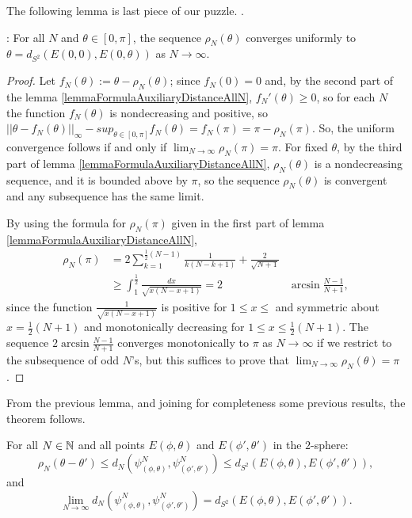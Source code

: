 The following lemma is last piece of our puzzle. \cite{DAndrea2013}.
\begin{lemma}: For all $N$ and $\theta \in [0, \pi]$, the sequence $\rho_N(\theta)$ converges uniformly to $\theta = d_{S^2}(E(0, 0), E(0, \theta))$ as $N\to \infty$. 
\end{lemma}

\begin{proof}
 Let $f_N(\theta) := \theta - \rho_N(\theta)$; since $f_N(0) = 0$ and, by the second part of the lemma \ref{lemmaFormulaAuxiliaryDistanceAllN}, $f_N'(\theta) \geq 0$, so for each $N$ the function $f_N(\theta)$ is nondecreasing and positive, so $|| \theta - f_N(\theta)||_\infty - sup_{\theta \in [0, \pi]} f_N(\theta) = f_N(\pi) = \pi - \rho_N(\pi)$. So, the uniform convergence follows if and only if $\lim_{N \to \infty} \rho_N(\pi) = \pi$. For fixed $\theta$, by the third part of lemma \ref{lemmaFormulaAuxiliaryDistanceAllN}, $\rho_N(\theta)$ is a nondecreasing sequence, and it is bounded above by $\pi$, so the sequence $\rho_N(\theta)$ is convergent and any subsequence has the same limit.
 
 By using the formula for $\rho_N(\pi)$ given in the first part of lemma \ref{lemmaFormulaAuxiliaryDistanceAllN}, 
 \begin{align*}
     \rho_N(\pi) &= 2 \sum_{k = 1}^{\frac{1}{2}(N-1)} \frac{1}{k (N - k + 1)} + \frac{2}{\sqrt{N+1}} \\
     &\geq \int_{1}^{\frac{1}{2}} \frac{dx}{\sqrt{x(N-x+1)}} = 2 &\arcsin \frac{N-1}{N+1},
 \end{align*} since the function $\frac{1}{\sqrt{x(N-x+1)}}$ is positive for $1 \leq x \leq $ and symmetric about $x = \frac{1}{2}(N+1)$ and monotonically decreasing for $1 \leq x \leq \frac{1}{2}(N+1)$. The sequence $2 \arcsin \frac{N-1}{N+1}$ converges monotonically to $\pi$ as $N \to \infty$ if we restrict to the subsequence of odd $N$'s, but this suffices to prove that $\lim_{N \to \infty} \rho_N(\theta) = \pi$.
\end{proof}

From the previous lemma, and joining for completeness some previous results, the theorem follows.
\begin{theorem} \label{theoremdNWithRespectoTodS2}
For all $N \in \mathbb{N}$ and all points $E(\phi, \theta)$ and $E(\phi', \theta')$ in the $2$-sphere:
$$
    \rho_N(\theta - \theta') \leq d_N(\psi^N_{(\phi, \theta)}, \psi^N_{(\phi', \theta')}) \leq d_{S^2}(E(\phi, \theta), E(\phi', \theta')),
$$
and 
\begin{equation}
        \lim_{N \to \infty} d_N(\psi^N_{(\phi, \theta)}, \psi^N_{(\phi', \theta')}) = d_{S^2}(E(\phi, \theta), E(\phi', \theta')).
\end{equation}
\end{theorem}


